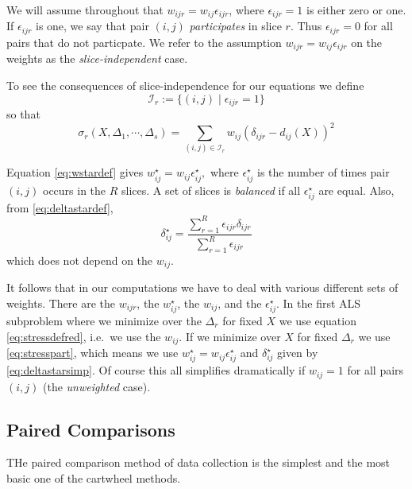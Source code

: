\documentclass[
  12pt,
]{article}
\begin{document}
We will assume throughout that \(w_{ijr}=w_{ij}\epsilon_{ijr}\), where
\(\epsilon_{ijr}=1\) is either zero or one. If \(\epsilon_{ijr}\) is one, we say that pair \((i,j)\) \emph{participates} in slice \(r\). Thus \(\epsilon_{ijr}=0\) for all pairs that do not particpate. We refer to the assumption \(w_{ijr}=w_{ij}\epsilon_{ijr}\) on the weights as the \emph{slice-independent} case.

To see the consequences of slice-independence for our equations
we define
\begin{equation}
\mathcal{I}_r:=\{(i, j)\mid \epsilon_{ijr}= 1\}
\label{eq:irdef}
\end{equation}
so that
\begin{equation}
\sigma_r(X,\Delta_1,\cdots,\Delta_s)=\sum_{(i,j)\in\mathcal{I}_r} w_{ij}(\delta_{ijr}-d_{ij}(X))^2
\label{eq:stressdefred}
\end{equation}

Equation \eqref{eq:wstardef} gives \(w_{ij}^\star=w_{ij}\epsilon_{ij}^\star,\)
where \(\epsilon_{ij}^\star\) is the number of times pair \((i,j)\) occurs in
the \(R\) slices. A set of slices is \emph{balanced} if all \(\epsilon_{ij}^\star\) are equal. Also, from \eqref{eq:deltastardef},
\begin{equation}
\delta_{ij}^\star=\frac{\sum_{r=1}^R \epsilon_{ijr}\delta_{ijr}}{\sum_{r=1}^R \epsilon_{ijr}}
\label{eq:deltastarsimp}
\end{equation}
which does not depend on the \(w_{ij}\).

It follows that in our computations we have to deal with various
different sets of weights. There are the \(w_{ijr}\), the \(w_{ij}^\star\),
the \(w_{ij}\), and the \(\epsilon_{ij}^\star\). In the first ALS subproblem
where we minimize over the \(\Delta_r\) for fixed \(X\) we use
equation \eqref{eq:stressdefred}, i.e.~we use the \(w_{ij}\). If we minimize over \(X\) for fixed \(\Delta_r\) we use \eqref{eq:stresspart}, which means we
use \(w_{ij}^\star=w_{ij}\epsilon_{ij}^\star\) and \(\delta_{ij}^\star\)
given by \eqref{eq:deltastarsimp}. Of course this all simplifies dramatically
if \(w_{ij}=1\) for all pairs \((i,j)\) (the \emph{unweighted} case).

\subsection{Paired Comparisons}\label{paired-comparisons}

THe paired comparison method of data collection is the simplest and
the most basic one of the cartwheel methods.
\end{document}

